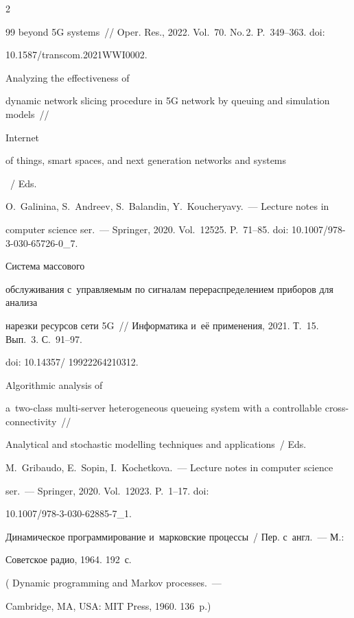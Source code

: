 \begin{multicols}{2}
{{\begin{thebibliography}{99}
beyond 5G systems~// Oper. Res., 2022. Vol.~70. No.\,2. P.~349--363. doi: 


10.1587/transcom.2021WWI0002.







 Analyzing the effectiveness of 


dynamic network slicing procedure in 5G network by queuing and simulation models~// {Internet 


of things, smart spaces, and next generation networks and systems}~/ Eds. 


O.~Galinina, S.~Andreev, S.~Balandin, Y.~Koucheryavy.~--- Lecture notes in 


computer science ser.~--- Springer, 2020. Vol.~12525. P.~71--85. doi: 10.1007/978-3-030-65726-0\_7.







 Система массового 


обслуживания с~управляемым по сигналам перераспределением приборов для анализа 


нарезки ресурсов сети 5G~// Информатика и~её применения, 2021. Т.~15. Вып.~3. С.~91--97.


doi:  10.14357/ 19922264210312.




 Algorithmic analysis of  


a~two-class multi-server heterogeneous queueing system with a controllable cross-connectivity~// 


Analytical and stochastic modelling techniques and applications~/ Eds. 


M.~Gribaudo, E.~Sopin, I.~Kochetkova.~--- Lecture notes in computer science  


ser.~--- Springer, 2020. Vol.~12023. P.~1--17. doi:  


10.1007/978-3-030-62885-7\_1.




 Динамическое программирование и~марковские процессы~/ Пер. с~англ.~--- М.: 


Советское радио, 1964. 192~с.


( {Dynamic programming and Markov processes}.~--- 


Cambridge, MA, USA: MIT Press, 1960. 136~p.)


  \end{thebibliography}





 }


 }





\end{multicols}





